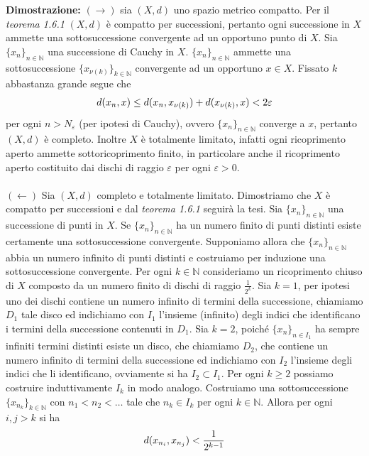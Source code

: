 \documentclass{article}
\begin{document}
\textbf{Dimostrazione:} $(\rightarrow)$ sia $(X, d)$ uno spazio metrico compatto. Per il \textit{teorema 1.6.1} $(X, d)$ è compatto per successioni, pertanto ogni successione in $X$ ammette una sottosuccessione convergente ad un opportuno punto di $X$. Sia $\{x_n\}_{n \in \mathbb{N}}$ una successione di Cauchy in $X$. $\{x_n\}_{n \in \mathbb{N}}$ ammette una sottosuccessione $\{x_{\nu(k)}\}_{k \in \mathbb{N}}$ convergente ad un opportuno $x \in X$. Fissato $k$ abbastanza grande segue che 
\begin{align}
    d(x_n, x) \leq d(x_n, x_{\nu(k)}) + d(x_{\nu(k)}, x) < 2\varepsilon \notag
\end{align}
per ogni $n > N_\varepsilon$ (per ipotesi di Cauchy), ovvero $\{x_n\}_{n \in \mathbb{N}}$ converge a $x$, pertanto $(X, d)$ è completo. Inoltre $X$ è totalmente limitato, infatti ogni ricoprimento aperto ammette sottoricoprimento finito, in particolare anche il ricoprimento aperto costituito dai dischi di raggio $\varepsilon$ per ogni $\varepsilon > 0$. \\ \\
$(\leftarrow)$ Sia $(X, d)$ completo e totalmente limitato. Dimostriamo che $X$ è compatto per successioni e dal \textit{teorema 1.6.1} seguirà la tesi. Sia $\{x_n\}_{n \in \mathbb{N}}$ una successione di punti in $X$. Se $\{x_n\}_{n \in \mathbb{N}}$ ha un numero finito di punti distinti esiste certamente una sottosuccessione convergente. Supponiamo allora che $\{x_n\}_{n \in \mathbb{N}}$ abbia un numero infinito di punti distinti e costruiamo per induzione una sottosuccessione convergente. Per ogni $k \in \mathbb{N}$ consideriamo un ricoprimento chiuso di $X$ composto da un numero finito di dischi di raggio $\frac{1}{2^k}$. Sia $k = 1$, per ipotesi uno dei dischi contiene un numero infinito di termini della successione, chiamiamo $D_1$ tale disco ed indichiamo con $I_1$ l'insieme (infinito) degli indici che identificano i termini della successione contenuti in $D_1$. Sia $k = 2$, poiché $\{x_n\}_{n \in I_1}$ ha sempre infiniti termini distinti esiste un disco, che chiamiamo $D_2$, che contiene un numero infinito di termini della successione ed indichiamo con $I_2$ l'insieme degli indici che li identificano, ovviamente si ha $I_2 \subset I_1$. Per ogni $k \geq 2$ possiamo costruire induttivamente $I_k$ in modo analogo. Costruiamo una sottosuccessione $\{x_{n_k}\}_{k \in \mathbb{N}}$ con $n_1 < n_2 < \dots$ tale che $n_k \in I_k$ per ogni $k \in \mathbb{N}$. Allora per ogni $i, j > k$ si ha 
\begin{align}
    d(x_{n_i}, x_{n_j}) < \frac{1}{2^{k - 1}} \notag
\end{align}
\end{document}
